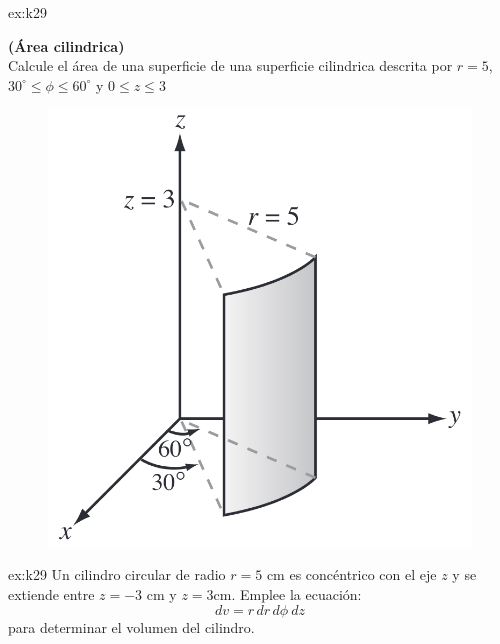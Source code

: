 \begin{excercise}[][][$S=\displaystyle{\frac{5\pi}{2}}$]{ex:k29}{ \textbf{(Área cilindrica)}\\
Calcule el área de una superficie de una superficie cilindrica descrita por $r=5$, $30^\circ\leq\phi\leq 60^\circ$ y $0\leq z\leq 3$            
\begin{figure}[H]
            \centering
            \includegraphics[width=0.7\linewidth]{img/01_electric-field/2.png}
        \end{figure}
        }
\end{excercise}

    \begin{excercise}[][][$V=471.2\, \rm{cm^3}$]{ex:k29}{ 
            Un cilindro circular de radio $r=5$ cm  es concéntrico con el eje $z$ y se extiende entre $z=-3$ cm y $z=3$cm. Emplee la ecuación:
            \begin{equation*}
                dv=r\,dr\,d\phi\ dz
            \end{equation*}
            para determinar el volumen del cilindro. 
        }
    \end{excercise}


